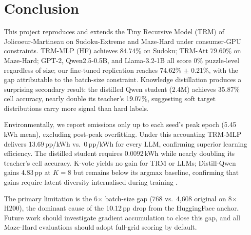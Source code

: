 \documentclass{article}
\begin{document}

\section{Conclusion}
\label{sec:conclusion}

This project reproduces and extends the Tiny Recursive Model (TRM) of Jolicoeur-Martineau  on Sudoku-Extreme and Maze-Hard under consumer-GPU constraints. TRM-MLP (HF) achieves 84.74\% on Sudoku; TRM-Att 79.60\% on Maze-Hard; GPT-2, Qwen2.5-0.5B, and Llama-3.2-1B all score 0\% puzzle-level regardless of size; our fine-tuned replication reaches 74.62\% $\pm$ 0.21\%, with the gap attributable to the batch-size constraint. Knowledge distillation produces a surprising secondary result: the distilled Qwen student (2.4M) achieves 35.87\% cell accuracy, nearly double its teacher's 19.07\%, suggesting soft target distributions carry more signal than hard labels.

Environmentally, we report emissions only up to each seed's peak epoch (5.45\,kWh mean), excluding post-peak overfitting. Under this accounting TRM-MLP delivers 13.69\,pp/kWh vs.\ 0\,pp/kWh for every LLM, confirming superior learning efficiency. The distilled student requires 0.0092\,kWh while nearly doubling its teacher's cell accuracy. K-vote yields no gain for TRM or LLMs; Distill-Qwen gains 4.83\,pp at $K=8$ but remains below its argmax baseline, confirming that gains require latent diversity internalised during training .

The primary limitation is the 6$\times$ batch-size gap (768 vs.\ 4{,}608 original on 8$\times$H200), the dominant cause of the 10.12\,pp drop from the HuggingFace anchor. Future work should investigate gradient accumulation to close this gap, and all Maze-Hard evaluations should adopt full-grid scoring by default.

\end{document}
